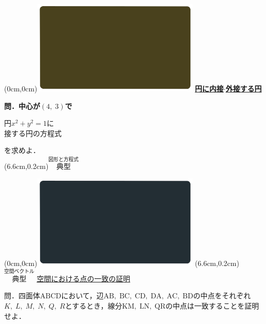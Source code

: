 \documentclass[10pt,
fleqn,
dvipdfmx,
uplatex
]{jsarticle}
\begin{document}
\at(0cm,0cm){\includegraphics[width=8cm,bb=0 0 1920 1080]{./youtube/thumbnails/templates/smart_background/図形と方程式.jpeg}}
{\color{orange}\bf\boldmath\LARGE\underline{円に内接$\cdot$外接する円}}\vspace{0.3zw}

\large
\bf\boldmath 問．中心が$\left(4,\;3\right)$で

\huge 
\hspace{0.1zw}
円$x^2+y^2=1$に\vspace{-0.1zw}\\
\hfill 接する円の方程式

\large
\hfill を求めよ．\\
\at(6.6cm,0.2cm){\small\color{bradorange}$\overset{\text{図形と方程式}}{\text{典型}}$}

\newpage



\at(0cm,0cm){\includegraphics[width=8cm,bb=0 0 1920 1080]{./youtube/thumbnails/templates/smart_background/空間ベクトル.jpeg}}
\at(6.6cm,0.2cm){\small\color{bradorange}$\overset{\text{空間ベクトル}}{\text{典型}}$}
{\color{orange}\Large\underline{空間における点の一致の証明}}\vspace{0.3zw}

\Large 
問．四面体$\text{ABCD}$において，辺$\text{AB},\;\text{BC},\;\text{CD},\;\text{DA},\;\text{AC},\;\text{BD}$の中点をそれぞれ$K,\;L,\;M,\;N,\;Q,\;R$とするとき，線分$\text{KM},\;\text{LN},\;\text{QR}$の中点は一致することを証明せよ．


\newpage
\end{document}
